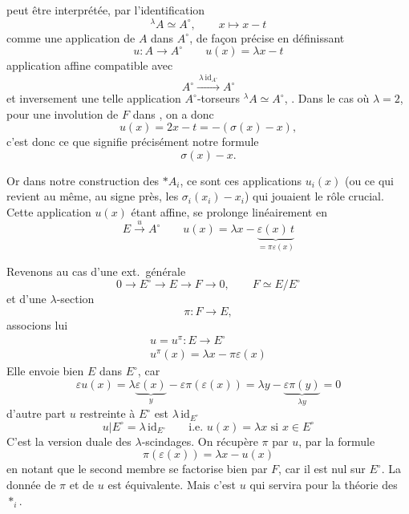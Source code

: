 \documentclass[11pt,a4paper]{article}
\begin{document}
peut être interprétée, par l'identification
\[
  {}^{\lambda}A \simeq A^{\circ}, \qquad x \longmapsto x - t
\]
comme une application de $A$ dans $A^{\circ}$, de façon précise en définissant
\[
  u : A \longrightarrow A^{\circ} \qquad u(x) = \lambda x - t
\]
application affine compatible avec
\[
  A^{\circ} \xrightarrow{\ \lambda\,\mathrm{id}_{A^{\circ}}\ } A^{\circ}
\]
et inversement une telle application \struck{\ill{}}   $A^{\circ}$-torseurs ${}^{\lambda}A \simeq A^{\circ}$,  .  Dans le cas où $\lambda = 2$, pour une involution de $F$ \ill{} \ill{} \ill{} dans , on a donc
\[
  u(x) = 2x - t = -(\sigma(x) - x),
\]
c'est donc ce que signifie précisément notre formule
\[
  \sigma(x) - x .
\]

Or dans notre construction des $\ast A_i$, ce sont ces applications $u_i(x)$ (ou ce qui revient au même, au signe près, les $\sigma_i(x_i) - x_i$) qui jouaient le rôle crucial.  Cette application $u(x)$ étant affine, se prolonge linéairement en
\[
  E \xrightarrow{\ u\ } A^{\circ} \qquad u(x) = \lambda x - \underbrace{\varepsilon(x)\, t}_{= \pi \varepsilon(x)}
\]

Revenons au cas d'une ext.\ générale
\[
  0 \longrightarrow E^{\circ} \longrightarrow E \longrightarrow F \longrightarrow 0,
  \qquad F \simeq E/E^{\circ}
\]
et d'une $\lambda$-section
\[
  \pi : F \longrightarrow E ,
\]
associons lui
\begin{gather*}
  u = u^{\pi} : E \longrightarrow E^{\circ} \\
  u^{\pi}(x) = \lambda x - \pi \varepsilon(x)
\end{gather*}
Elle envoie bien $E$ dans $E^{\circ}$, car
\[
  \varepsilon u(x) = \lambda \underbrace{\varepsilon(x)}_{y} - \varepsilon\pi(\varepsilon(x))
  = \lambda y - \underbrace{\varepsilon\pi(y)}_{\lambda y} = 0
\]
d'autre part $u$ restreinte à $E^{\circ}$ est $\lambda\, \mathrm{id}_{E^{\circ}}$
\[
  u | E^{\circ} = \lambda\, \mathrm{id}_{E^{\circ}} \qquad \text{i.e. } u(x) = \lambda x \text{ si } x \in E^{\circ}
\]
C'est la version duale des $\lambda$-scindages. On récupère $\pi$ par $u$, par la formule
\[
  \pi(\varepsilon(x)) = \lambda x - u(x)
\]
en notant que le second membre se factorise bien par $F$, car il est nul sur $E^{\circ}$. La donnée de $\pi$ et de $u$ est équivalente. Mais c'est $u$ qui servira pour la théorie des $\mathop{\ast}_{i}$.
\end{document}
